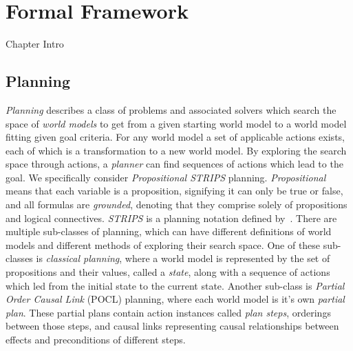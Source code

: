 \chapter{Formal Framework}\label{chap:framework}

Chapter Intro


\section{Planning}


\textit{Planning} describes a class of problems and associated solvers which search the space of \textit{world models} to get from a given starting world model to a world model fitting given goal criteria. For any world model a set of applicable actions exists, each of which is a transformation to a new world model. By exploring the search space through actions, a \textit{planner} can find sequences of actions which lead to the goal. We specifically consider \textit{Propositional STRIPS} planning. \textit{Propositional} means that each variable is a proposition, signifying it can only be true or false, and all formulas are \textit{grounded}, denoting that they comprise solely of propositions and logical connectives. \textit{STRIPS} is a planning notation defined by~\cite{STRIPS: A NEW APPROACH TO THE APPLICATION OF THEOREM PROVING TO PROBLEM SOLVING}. There are multiple sub-classes of planning, which can have different definitions of world models and different methods of exploring their search space. One of these sub-classes is \textit{classical planning}, where a world model is represented by the set of propositions and their values, called a \textit{state}, along with a sequence of actions which led from the initial state to the current state. Another sub-class is \textit{Partial Order Causal Link} (POCL) planning, where each world model is it's own \textit{partial plan}. These partial plans contain action instances called \textit{plan steps}, orderings between those steps, and causal links representing causal relationships between effects and preconditions of different steps.\\


